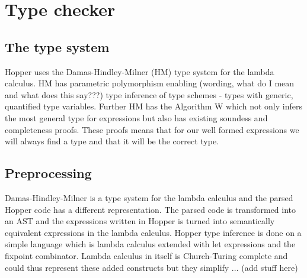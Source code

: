 \section{Type checker}

\subsection{The type system}

Hopper uses the Damas-Hindley-Milner (HM) type system for the lambda calculus. HM has parametric polymorphism enabling (wording, what do I mean and what does this say???) type inference of type schemes - types with generic, quantified type variables. Further HM has the Algorithm W which not only infers the most general type for expressions but also has existing soundess and completeness proofs. These proofs means that for our well formed expressions we will always find a type and that it will be the correct type.

\subsection{Preprocessing}

Damas-Hindley-Milner is a type system for the lambda calculus and the parsed Hopper code has a different representation. The parsed code is transformed into an AST and the expressions written in Hopper is turned into semantically equivalent expressions in the lambda calculus. Hopper type inference is done on a simple language which is lambda calculus extended with let expressions and the fixpoint combinator. Lambda calculus in itself is Church-Turing complete and could thus represent these added constructs but they simplify ... (add stuff here)

